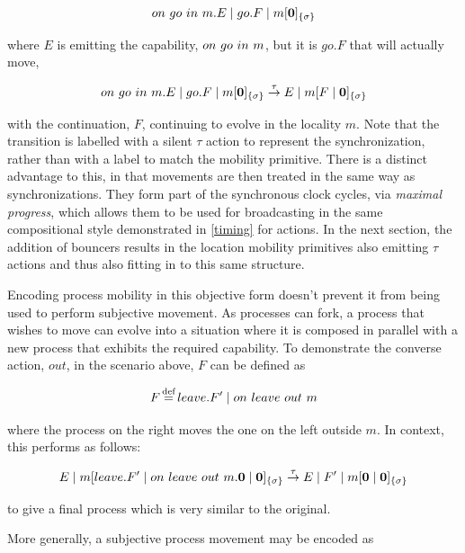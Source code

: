 \begin{equation}
on\ go\ in\ m.E \;|\; go.F \;|\; {m}[ \textbf{0} ]_{\{\sigma\}}
\end{equation}

\noindent where $E$ is emitting the capability, $on\ go\ in\ m$, but it
is $go.F$ that will actually move,

\begin{equation}
on\ go\ in\ m.E \;|\; go.F \;|\; {m}[ \textbf{0} ]_{\{\sigma\}} \stackrel{\tau}{\rightarrow}
E \;|\; {m}[ F \;|\; \textbf{0} ]_{\{\sigma\}}
\end{equation}

\noindent with the continuation, $F$, continuing to evolve in the
locality $m$.  Note that the transition is labelled with a silent $\tau$
action to represent the synchronization, rather than with a label to
match the mobility primitive.  There is a distinct advantage to this, in
that movements are then treated in the same way as synchronizations.
They form part of the synchronous clock cycles, via \emph{maximal
progress}, which allows them to be used for broadcasting in the same
compositional style demonstrated in \ref{timing} for actions.  In the
next section, the addition of bouncers results in the location mobility
primitives also emitting $\tau$ actions and thus also fitting in to this
same structure. 

Encoding process mobility in this objective form doesn't prevent it from
being used to perform subjective movement.  As processes can fork, a
process that wishes to move can evolve into a situation where it is
composed in parallel with a new process that exhibits the required
capability.  To demonstrate the converse action, $out$, in the scenario
above, $F$ can be defined as

\begin{equation}
F \operatorname{\stackrel{\textrm{def}}{=}} leave.F^\prime \;|\; on\ leave\ out\ m
\end{equation}

\noindent where the process on the right moves the one on the left
outside $m$.  In context, this performs as follows:

\begin{equation}
E \;|\; {m}[ leave.F^\prime \;|\; on\ leave\ out\ m.\textbf{0} \;|\;
 \textbf{0} ]_{\{\sigma\}} 
\stackrel{\tau}{\rightarrow}
E \;|\; F^\prime \;|\; {m}[ \textbf{0} \;|\; \textbf{0} ]_{\{\sigma\}}
\end{equation}

\noindent to give a final process which is very similar to the original.

More generally, a subjective process movement may be encoded as


